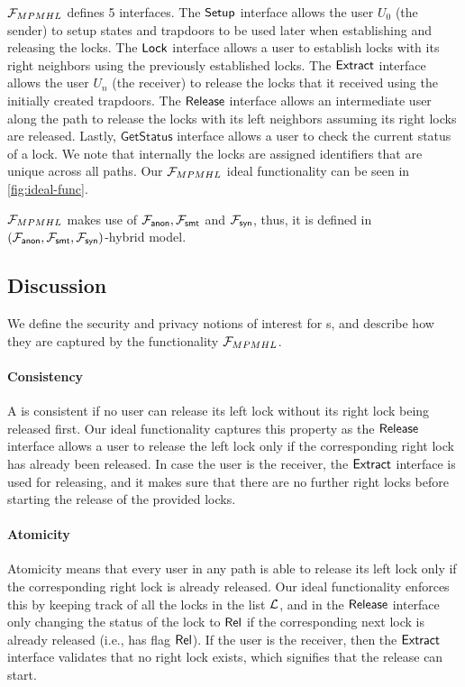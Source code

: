 $\mathcal{F}_{MPMHL}$ defines 5 interfaces. The $\mathsf{Setup}$ interface allows the user $U_0$ (the sender) 
to setup states and trapdoors to be used later when establishing and releasing the locks. The $\mathsf{Lock}$ 
interface allows a user to establish locks with its right neighbors using the previously established 
locks. The $\mathsf{Extract}$ interface allows the user $U_n$ (the receiver) to release the locks that it 
received using the initially created trapdoors. The $\mathsf{Release}$ interface allows an intermediate user 
along the path to release the locks with its left neighbors assuming its right locks are released. 
Lastly, $\mathsf{GetStatus}$ interface allows a user to check the current status of a lock. We note 
that internally the locks are assigned identifiers that are unique across all paths. Our $\mathcal{F}_{MPMHL}$ 
ideal functionality can be seen in \cref{fig:ideal-func}.

$\mathcal{F}_{MPMHL}$ makes use of $\mathcal{F}_{\mathsf{anon}}, \mathcal{F}_{\mathsf{smt}}$ and $\mathcal{F}_{\mathsf{syn}}$, thus, it is defined in 
$(\mathcal{F}_{\mathsf{anon}}, \mathcal{F}_{\mathsf{smt}}, \mathcal{F}_{\mathsf{syn}})$-hybrid model.

\subsection{Discussion}


We define the security and privacy notions of interest for {\sysname}s, and describe how they 
are captured by the functionality $\mathcal{F}_{MPMHL}$.

\paragraph{Consistency} A \sysname is consistent if no user can release its left lock without its 
right lock being released first. Our ideal functionality captures this property as the $\mathsf{Release}$ 
interface allows a user to release the left lock only if the corresponding right lock has already 
been released. In case the user is the receiver, the $\mathsf{Extract}$ interface is used for releasing, 
and it makes sure that there are no further right locks before starting the release of the provided 
locks.


\paragraph{Atomicity} Atomicity means that every user in any path is able to release its left lock 
only if the corresponding right lock is already released. Our ideal functionality enforces this by 
keeping track of all the locks in the list $\mathcal{L}$, and in the $\mathsf{Release}$ interface only changing the 
status of the lock to $\mathsf{Rel}$ if the corresponding next lock is already released (i.e., has flag $\mathsf{Rel}$). 
If the user is the receiver, then the $\mathsf{Extract}$ interface validates that no right lock exists, which 
signifies that the release can start.

